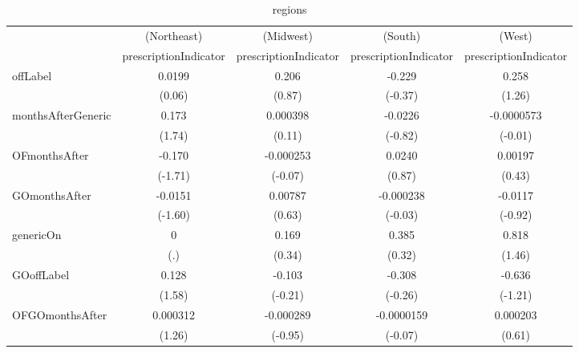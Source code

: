 \begin{table}[htbp]\centering
\def\sym#1{\ifmmode^{#1}\else\(^{#1}\)\fi}
\caption{regions\label{tab1}}
\begin{tabular}{l*{4}{c}}
\hline\hline
            &\multicolumn{1}{c}{(Northeast)}&\multicolumn{1}{c}{(Midwest)}&\multicolumn{1}{c}{(South)}&\multicolumn{1}{c}{(West)}\\
            &\multicolumn{1}{c}{prescriptionIndicator}&\multicolumn{1}{c}{prescriptionIndicator}&\multicolumn{1}{c}{prescriptionIndicator}&\multicolumn{1}{c}{prescriptionIndicator}\\
\hline
offLabel    &      0.0199         &       0.206         &      -0.229         &       0.258         \\
            &      (0.06)         &      (0.87)         &     (-0.37)         &      (1.26)         \\
[1em]
monthsAfterGeneric&       0.173         &    0.000398         &     -0.0226         &  -0.0000573         \\
            &      (1.74)         &      (0.11)         &     (-0.82)         &     (-0.01)         \\
[1em]
OFmonthsAfter&      -0.170         &   -0.000253         &      0.0240         &     0.00197         \\
            &     (-1.71)         &     (-0.07)         &      (0.87)         &      (0.43)         \\
[1em]
GOmonthsAfter&     -0.0151         &     0.00787         &   -0.000238         &     -0.0117         \\
            &     (-1.60)         &      (0.63)         &     (-0.03)         &     (-0.92)         \\
[1em]
genericOn   &           0         &       0.169         &       0.385         &       0.818         \\
            &         (.)         &      (0.34)         &      (0.32)         &      (1.46)         \\
[1em]
GOoffLabel  &       0.128         &      -0.103         &      -0.308         &      -0.636         \\
            &      (1.58)         &     (-0.21)         &     (-0.26)         &     (-1.21)         \\
[1em]
OFGOmonthsAfter&    0.000312         &   -0.000289         &  -0.0000159         &    0.000203         \\
            &      (1.26)         &     (-0.95)         &     (-0.07)         &      (0.61)         \\

\end{tabular}
\end{table}
